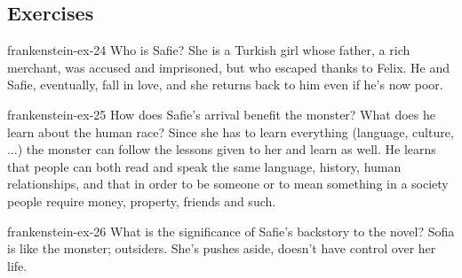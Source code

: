 \documentclass[preview]{standalone}
\begin{document}
\genpage

\subsection{Exercises}

\begin{snippetexercise}{frankenstein-ex-24}
    {Who is Safie?}
    She is a Turkish girl whose father, a rich merchant, was accused and
    imprisoned, but who escaped thanks to Felix.
    He and Safie, eventually, fall in love, 
    and she returns back to him even if he's now poor.
\end{snippetexercise}

\begin{snippetexercise}{frankenstein-ex-25}
    {How does Safie's arrival benefit the monster? What does he learn about the human race?}
    Since she has to learn everything (language, culture, ...)
    the monster can follow the lessons given to her and learn as well.
    He learns that people can both read and speak the same language,
    history, human relationships,
    and that in order to be someone or to mean something in a society
    people require money, property, friends and such.
\end{snippetexercise}

\begin{snippetexercise}{frankenstein-ex-26}
    {What is the significance of Safie's backstory to the novel?}
    Sofia is like the monster; outsiders.
    She's pushes aside, doesn't have control over her life.
\end{snippetexercise}
\end{document}
